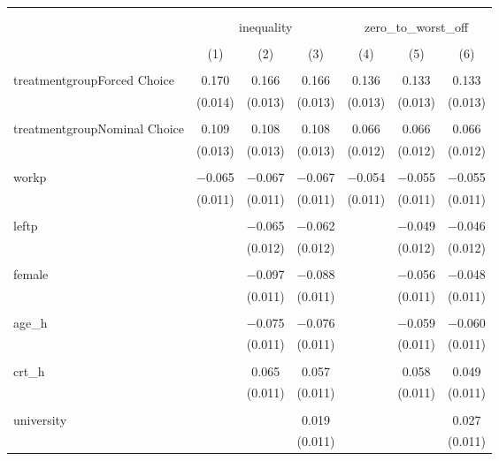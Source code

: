 
\begin{table}[!htbp] \centering 
  \caption{} 
  \label{} 
\begin{tabular}{@{\extracolsep{5pt}}lcccccc} 
\\[-1.8ex]\hline 
\hline \\[-1.8ex] 
\\[-1.8ex] & \multicolumn{3}{c}{inequality} & \multicolumn{3}{c}{zero\_to\_worst\_off} \\ 
\\[-1.8ex] & (1) & (2) & (3) & (4) & (5) & (6)\\ 
\hline \\[-1.8ex] 
 treatmentgroupForced Choice & 0.170 & 0.166 & 0.166 & 0.136 & 0.133 & 0.133 \\ 
  & (0.014) & (0.013) & (0.013) & (0.013) & (0.013) & (0.013) \\ 
  & & & & & & \\ 
 treatmentgroupNominal Choice & 0.109 & 0.108 & 0.108 & 0.066 & 0.066 & 0.066 \\ 
  & (0.013) & (0.013) & (0.013) & (0.012) & (0.012) & (0.012) \\ 
  & & & & & & \\ 
 workp & $-$0.065 & $-$0.067 & $-$0.067 & $-$0.054 & $-$0.055 & $-$0.055 \\ 
  & (0.011) & (0.011) & (0.011) & (0.011) & (0.011) & (0.011) \\ 
  & & & & & & \\ 
 leftp &  & $-$0.065 & $-$0.062 &  & $-$0.049 & $-$0.046 \\ 
  &  & (0.012) & (0.012) &  & (0.012) & (0.012) \\ 
  & & & & & & \\ 
 female &  & $-$0.097 & $-$0.088 &  & $-$0.056 & $-$0.048 \\ 
  &  & (0.011) & (0.011) &  & (0.011) & (0.011) \\ 
  & & & & & & \\ 
 age\_h &  & $-$0.075 & $-$0.076 &  & $-$0.059 & $-$0.060 \\ 
  &  & (0.011) & (0.011) &  & (0.011) & (0.011) \\ 
  & & & & & & \\ 
 crt\_h &  & 0.065 & 0.057 &  & 0.058 & 0.049 \\ 
  &  & (0.011) & (0.011) &  & (0.011) & (0.011) \\ 
  & & & & & & \\ 
 university &  &  & 0.019 &  &  & 0.027 \\ 
  &  &  & (0.011) &  &  & (0.011) \\ 

\end{tabular}
\end{table}
